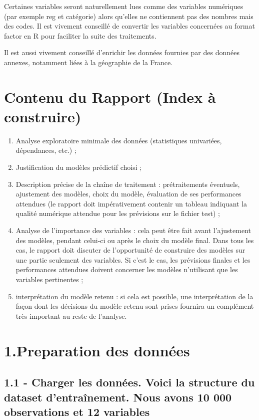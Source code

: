 \documentclass[]{article}
\providecommand{\tightlist}{%
  \setlength{\itemsep}{0pt}\setlength{\parskip}{0pt}}
\begin{document}
Certaines variables seront naturellement lues comme des variables
numériques (par exemple reg et catégorie) alors qu'elles ne contiennent
pas des nombres mais des codes. Il est vivement conseillé de convertir
les variables concernées au format factor en R pour faciliter la suite
des traitements.

Il est aussi vivement conseillé d'enrichir les données fournies par des
données annexes, notamment liées à la géographie de la France.

\section{Contenu du Rapport (Index à
construire)}\label{contenu-du-rapport-index-a-construire}

\begin{enumerate}
\def\labelenumi{\arabic{enumi}.}
\tightlist
\item
  Analyse exploratoire minimale des données (statistiques univariées,
  dépendances, etc.) ;
\item
  Justification du modèles prédictif choisi ;
\item
  Description précise de la chaîne de traitement : prétraitements
  éventuels, ajustement des modèles, choix du modèle, évaluation de ses
  performances attendues (le rapport doit impérativement contenir un
  tableau indiquant la qualité numérique attendue pour les prévisions
  sur le fichier test) ;
\item
  Analyse de l'importance des variables : cela peut être fait avant
  l'ajustement des modèles, pendant celui-ci ou après le choix du modèle
  final. Dans tous les cas, le rapport doit discuter de l'opportunité de
  construire des modèles sur une partie seulement des variables. Si
  c'est le cas, les prévisions finales et les performances attendues
  doivent concerner les modèles n'utilisant que les variables
  pertinentes ;
\item
  interprétation du modèle retenu : si cela est possible, une
  interprétation de la façon dont les décisions du modèle retenu sont
  prises fournira un complément très important au reste de l'analyse.
\end{enumerate}

\section{1.Preparation des données}\label{preparation-des-donnees}

\subsection{1.1 - Charger les données. Voici la structure du dataset
d'entraînement. Nous avons 10 000 observations et 12
variables}\label{charger-les-donnees.-voici-la-structure-du-dataset-dentrainement.-nous-avons-10-000-observations-et-12-variables}
\end{document}
